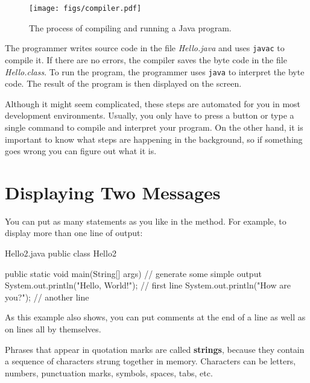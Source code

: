\begin{figure}[!ht]
\begin{center}
\texttt{[image: figs/compiler.pdf]}
\caption{The process of compiling and running a Java program.}
\label{fig.compiler}
\end{center}
\end{figure}

The programmer writes source code in the file {\it Hello.java} and uses {\tt javac} to compile it.
If there are no errors, the compiler saves the byte code in the file {\it Hello.class}.
To run the program, the programmer uses {\tt java} to interpret the byte code.
The result of the program is then displayed on the screen.

Although it might seem complicated, these steps are automated for you in most development environments.
Usually, you only have to press a button or type a single command to compile and interpret your program.
On the other hand, it is important to know what steps are happening in the background, so if something goes wrong you can figure out what it is.


\section{Displaying Two Messages}
\label{computer-programming_displaying-two-messages}

You can put as many statements as you like in the  method.
For example, to display more than one line of output:

\begin{trinket}[250]{Hello2.java}
public class Hello2 {

    public static void main(String[] args) {
        // generate some simple output
        System.out.println("Hello, World!");  // first line
        System.out.println("How are you?");   // another line
    }
}
\end{trinket}

As this example also shows, you can put comments at the end of a line as well as on lines all by themselves.


Phrases that appear in quotation marks are called {\bf strings}, because they contain a sequence of characters strung together in memory.
Characters can be letters, numbers, punctuation marks, symbols, spaces, tabs, etc.


